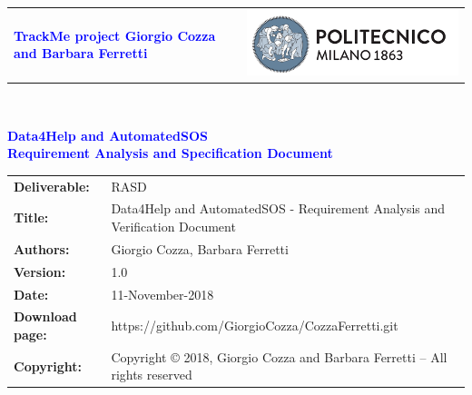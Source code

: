
\usepackage{hyperref}
\usepackage{subfig}

\hypersetup{
	colorlinks = true,
	linkcolor = black
}



\begin{titlepage}



{\begin{table}[t!]
\centering
\begin{tabu} to \textwidth { X[1.3,r,p] X[1.7,l,p] }
\textcolor{Blue}
{\textbf{\small{TrackMe project Giorgio Cozza and Barbara Ferretti}}} & \includegraphics[scale=0.5]{Images/PolimiLogo}
\end{tabu}
\end{table}}~\\ [7cm]


\begin{center}

{\textcolor{Blue}{\textbf{\Huge{Data4Help and AutomatedSOS}}}} \\ [0,5cm]
{\textcolor{Blue}{\textbf{\LARGE{Requirement Analysis and Specification Document}}}} \\ [1cm]


\end{center}

\end{titlepage}

\begin{table}[h!]
\begin{tabu} to \textwidth { X[0.3,r,p] X[0.7,l,p] }
\hline

\textbf{Deliverable:} & RASD\\
\textbf{Title:} & Data4Help and AutomatedSOS - Requirement Analysis and Verification Document \\
\textbf{Authors:} & Giorgio Cozza, Barbara Ferretti \\
\textbf{Version:} & 1.0 \\ 
\textbf{Date:} & 11-November-2018 \\
\textbf{Download page:} & https://github.com/GiorgioCozza/CozzaFerretti.git \\
\textbf{Copyright:} & Copyright © 2018, Giorgio Cozza and Barbara Ferretti – All rights reserved \\
\hline
\end{tabu}
\end{table}




